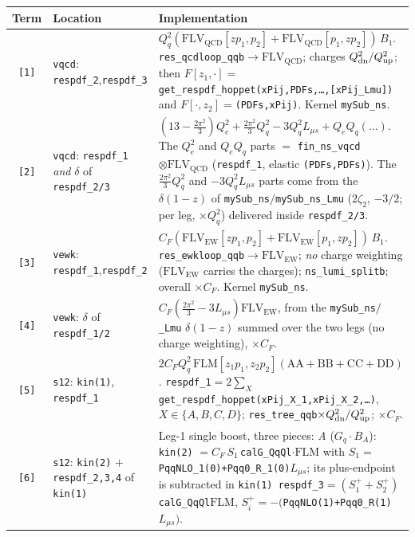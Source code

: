 \documentclass[11pt]{article}
\newcommand{\code}[1]{\texttt{#1}}
\newcommand{\FLM}{\ensuremath{\mathrm{FLM}}}
\newcommand{\FLVQCD}{\ensuremath{\mathrm{FLV}_{\mathrm{QCD}}}}
\newcommand{\FLVEW}{\ensuremath{\mathrm{FLV}_{\mathrm{EW}}}}
\newcommand{\Lms}{\ensuremath{L_{\mu s}}}
\newcommand{\zt}{\ensuremath{\zeta_2}}\newcommand{\ztt}{\ensuremath{\zeta_3}}
\begin{document}
\begin{center}\small
\begin{longtable}{@{}c p{4.7cm} p{8.7cm}@{}}
\toprule
\textbf{Term} & \textbf{Location} & \textbf{Implementation}\\
\midrule\endhead
\code{[1]} & \code{vqcd}: \code{respdf\_2},\code{respdf\_3}
 & $Q_q^2(\FLVQCD[z p_1,p_2]+\FLVQCD[p_1,z p_2])\,B_1$.
   \code{res\_qcdloop\_qqb}$\to\FLVQCD$; charges $Q_{\rm dn}^2/Q_{\rm up}^2$; then
   $F[z_1,\cdot]=$\code{get\_respdf\_hoppet(xPij,PDFs,\dots,[xPij\_Lmu])} and
   $F[\cdot,z_2]=$\code{(PDFs,xPij)}. Kernel \code{mySub\_ns}.\\
\code{[2]} & \code{vqcd}: \code{respdf\_1} \emph{and} $\delta$ of \code{respdf\_2/3}
 & $(13-\tfrac{2\pi^2}{3})Q_e^2+\tfrac{2\pi^2}{3}Q_q^2-3Q_q^2\Lms+Q_eQ_q(\dots)$.
   The $Q_e^2$ and $Q_eQ_q$ parts $=$ \code{fin\_ns\_vqcd}$\otimes\FLVQCD$ (\code{respdf\_1},
   elastic \code{(PDFs,PDFs)}). The $\tfrac{2\pi^2}{3}Q_q^2$ and $-3Q_q^2\Lms$ parts come from
   the $\delta(1-z)$ of \code{mySub\_ns}$/$\code{mySub\_ns\_Lmu} ($2\zt$, $-3/2$; per leg,
   $\times Q_q^2$) delivered inside \code{respdf\_2/3}.\\
\code{[3]} & \code{vewk}: \code{respdf\_1},\code{respdf\_2}
 & $C_F(\FLVEW[z p_1,p_2]+\FLVEW[p_1,z p_2])\,B_1$. \code{res\_ewkloop\_qqb}$\to\FLVEW$;
   \emph{no} charge weighting ($\FLVEW$ carries the charges); \code{ns\_lumi\_splitb};
   overall $\times C_F$. Kernel \code{mySub\_ns}.\\
\code{[4]} & \code{vewk}: $\delta$ of \code{respdf\_1/2}
 & $C_F(\tfrac{2\pi^2}{3}-3\Lms)\FLVEW$, from the \code{mySub\_ns}$/$\code{\_Lmu}
   $\delta(1-z)$ summed over the two legs (no charge weighting), $\times C_F$.\\
\code{[5]} & \code{s12}: \code{kin(1)}, \code{respdf\_1}
 & $2C_FQ_q^2\,\FLM[z_1p_1,z_2p_2](\mathrm{AA}{+}\mathrm{BB}{+}\mathrm{CC}{+}\mathrm{DD})$.
   \code{respdf\_1}$=2\sum_{X}$\code{get\_respdf\_hoppet(xPij\_X\_1,xPij\_X\_2,\dots)}, $X\in\{A,B,C,D\}$;
   \code{res\_tree\_qqb}$\times Q_{\rm dn}^2/Q_{\rm up}^2$; $\times C_F$.\\
\code{[6]} & \code{s12}: \code{kin(2)} $+$ \code{respdf\_2,3,4} of \code{kin(1)}
 & Leg-1 single boost, three pieces:\newline
   \emph{A} ($G_q\!\cdot\!B_A$): \code{kin(2)} $=C_F\,S_1\,$\code{calG\_QqQl}$\cdot\FLM$
   with $S_1=$\code{PqqNLO\_1(0)+Pqq0\_R\_1(0)}$\Lms$; its plus-endpoint is subtracted in
   \code{kin(1) respdf\_3}$=(S_1^+{+}S_2^+)$\code{calG\_QqQl}$\FLM$, $S_i^+=-($\code{PqqNLO(1)+Pqq0\_R(1)}$\Lms)$.\newline

\end{longtable}
\end{center}
\end{document}
